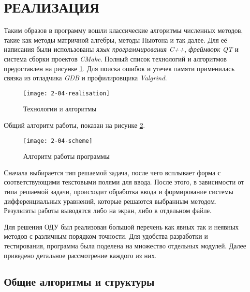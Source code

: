 \section{РЕАЛИЗАЦИЯ}

Таким образов в программу вошли классические алгоритмы численных методов, такие как методы матричной алгебры, методы
Ньютона и так далее. Для её написания были использованы \textit{язык программирования C++}, \textit{фреймворк QT} и система сборки
проектов \textit{CMake}. Полный список технологий и алгоритмов предоставлен на рисунке \ref{fig:stack}.
Для поиска ошибок и утечек памяти применилась связка из отладчика \textit{GDB} и профилировщика \textit{Valgrind}. 

\begin{figure}
    \texttt{[image: 2-04-realisation]}
    \caption{Технологии и алгоритмы}
    \label{fig:stack}
\end{figure}

Общий алгоритм работы, показан на рисунке \ref{fig:sheme}.

\begin{figure}
    \texttt{[image: 2-04-scheme]}
    \caption{Алгоритм работы программы}
    \label{fig:sheme}
\end{figure}

Сначала выбирается тип решаемой задача, после чего всплывает форма с соответствующими текстовыми полями для ввода. После этого, в
зависимости от типа решаемой задачи, происходит обработка ввода и формирование системы дифференциальных уравнений, которые решаются
выбранным методом. Результаты работы выводятся либо на экран, либо в отдельном файле.

Для решения ОДУ был реализован большой перечень как явных так и неявных методов с различным порядком точности. Для удобства разработки
и тестирования, программа была поделена на множество отдельных модулей. Далее приведено детальное рассмотрение каждого из них.




\subsection{Общие алгоритмы и структуры}

